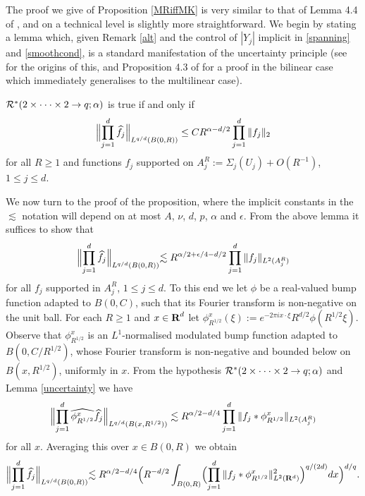 The proof we give of Proposition \ref{MRiffMK} is very similar to
that of Lemma 4.4 of \cite{TVV}, and on a technical level is slightly
more straightforward. We begin by stating a lemma
which, given Remark \ref{alt} and the control of $|Y_{j}|$
implicit in \eqref{spanning} and \eqref{smoothcond}, is a standard
manifestation of the uncertainty principle (see \cite{Co} for the
origins of this, and
Proposition 4.3 of \cite{TVV} for a proof in the
bilinear case which immediately generalises to the multilinear case).
\begin{lemma}\label{uncertainty}
${\mathcal{R}}^*(2\times\cdot\cdot\cdot\times 2\rightarrow
q;\alpha)$ is true if and only if
\begin{equation}\label{smudge}
\Bigl\|\prod_{j=1}^{d}\widehat{f}_{j}\Bigr\|_{L^{q/d}(B(0,R))}
\leq C R^{\alpha-d/2}\prod_{j=1}^{d}\|f_j\|_{2}
\end{equation}
for all
$R\geq 1$ and functions $f_j$ supported on
$A_{j}^{R}:=\Sigma_{j}(U_{j})+O(R^{-1})$, $1\leq j\leq d$.
\end{lemma}
We now turn to the proof of the proposition, where the implicit
constants in the $\lesssim$ notation will depend on at most
$A$, $\nu$, $d$, $p$, $\alpha$ and $\epsilon$. From the above
lemma it suffices to show that
$$
\Bigl\|\prod_{j=1}^{d}\widehat{f}_{j}\Bigl\|_{L^{q/d}(B(0,R))}
\lesssim R^{\alpha/2+\epsilon/4-d/2}\prod_{j=1}^{d}\|f_{j}\|_{L^2(A^R_j)}
$$
for all $f_j$ supported in $A_{j}^{R}$, $1\leq j\leq d$. To this
end we let $\phi$ be a real-valued bump function adapted to
$B(0,C)$, such that its Fourier transform is non-negative on the
unit ball. For each $R\geq 1$ and $x\in{\hbox{\bf R}}^d$ let
$\phi_{R^{1/2}}^{x}(\xi) := e^{-2\pi
ix\cdot\xi}R^{d/2}\phi(R^{1/2}\xi)$. Observe that
$\phi_{R^{1/2}}^{x}$ is an $L^1$-normalised modulated bump
function adapted to $B(0,C/R^{1/2})$, whose Fourier transform is
non-negative and bounded below on $B(x,R^{1/2})$, uniformly in
$x$. From the hypothesis ${\mathcal{R}}^*(2\times\cdot\cdot\cdot\times
2\rightarrow q;\alpha)$ and Lemma \ref{uncertainty}
we have
\begin{equation}\label{48}
\Bigl\|\prod_{j=1}^{d}\widehat{\phi_{R^{1/2}}^{x}}\widehat{f}_{j}\Bigr\|
_{L^{q/d}(B(x,R^{1/2}))}
\lesssim
R^{\alpha/2-d/4}\prod_{j=1}^{d}\|f_{j}*\phi_{R^{1/2}}^{x}\|_{L^2(A^R_j)}
\end{equation}
for all $x$. Averaging this over $x\in B(0,R)$ we obtain
\begin{equation}\label{49}
\Bigl\|\prod_{j=1}^{d}\widehat{f}_{j}\Bigl\|_{L^{q/d}(B(0,R))}
\lesssim R^{\alpha/2-d/4}\Bigl(
R^{-d/2}\int_{B(0,R)}\Bigl(\prod_{j=1}^{d}
\|f_{j}*\phi_{R^{1/2}}^{x}\|_{L^2({\bf R}^d)}^{2}\Bigr)^{q/(2d)}dx\Bigr)^{d/q}.
\end{equation}
